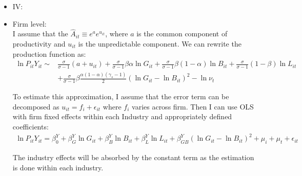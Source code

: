 \begin{itemize}
    \item IV:\\
    \item Firm level:\\
    I assume that the $\hat{A}_{it} \equiv e^a e^{u_{it}}$, where $a$ is the common component of productivity and $u_{it}$ is the unpredictable component. We can rewrite the production function as:
    \begin{equation*}
        \begin{split}
           \ln P_{it}Y_{it} \sim  & \frac{\sigma}{\sigma-1}(a + u_{it}) +  \frac{\sigma}{\sigma-1}\beta\alpha \ln G_{it}   + \frac{\sigma}{\sigma-1}\beta(1-\alpha)\ln B_{it} + \frac{\sigma}{\sigma-1}(1-\beta) \ln L_{it} \\
            & + \frac{\sigma}{\sigma-1}\beta \frac{\alpha (1-\alpha)(\gamma_s - 1)}{2}(\ln G_{it} - \ln B_{it})^2 - \ln \nu_{t}
       \end{split}
    \end{equation*}
    
    To estimate this approximation, I assume that the error term can be decomposed as $u_{it} = f_i + \epsilon_{it}$ where $f_i$ varies across firm. Then I can use OLS with firm fixed effects  within each Industry and appropriately defined coefficients:
    \begin{gather*}
        \ln P_{it}Y_{it} = \beta_0^Y + \beta_G^Y \ln G_{it} + \beta_B^Y \ln B_{it} + \beta_L^Y \ln L_{it} + \beta_{GB}^Y (\ln G_{it} - \ln B_{it})^2 + \mu_i + \mu_t + \epsilon_{it}
    \end{gather*}
    
    The industry effects will be absorbed by the constant term as the estimation is done within each industry.  
    

\end{itemize}
